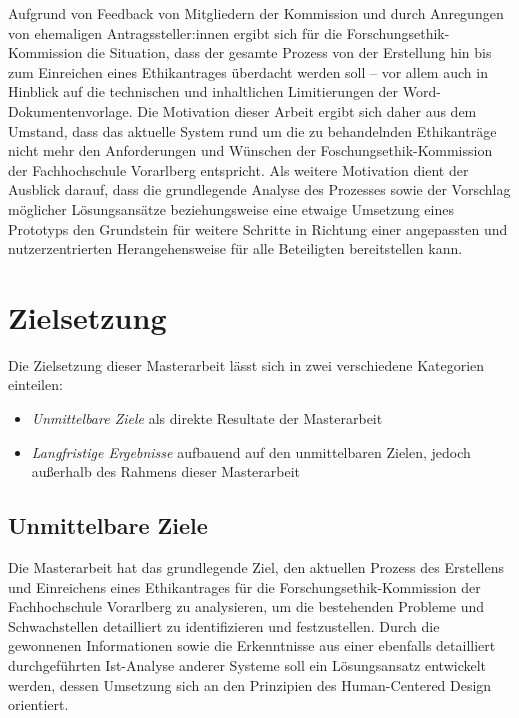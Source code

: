 \medskip

Aufgrund von Feedback von Mitgliedern der Kommission und durch Anregungen von ehemaligen Antragssteller:innen ergibt sich für die Forschungsethik-Kommission die Situation, dass der gesamte Prozess von der Erstellung hin bis zum Einreichen eines Ethikantrages überdacht werden soll -- vor allem auch in Hinblick auf die technischen und inhaltlichen Limitierungen der Word-Dokumentenvorlage. Die Motivation dieser Arbeit ergibt sich daher aus dem Umstand, dass das aktuelle System rund um die zu behandelnden Ethikanträge nicht mehr den Anforderungen und Wünschen der Foschungsethik-Kommission der Fachhochschule Vorarlberg entspricht. Als weitere Motivation dient der Ausblick darauf, dass die grundlegende Analyse des Prozesses sowie der Vorschlag möglicher Lösungsansätze beziehungsweise eine etwaige Umsetzung eines Prototyps den Grundstein für weitere Schritte in Richtung einer angepassten und nutzerzentrierten Herangehensweise für alle Beteiligten bereitstellen kann. 

\section{Zielsetzung}
\label{sec:zielsetzung}

Die Zielsetzung dieser Masterarbeit lässt sich in zwei verschiedene Kategorien einteilen:
\begin{itemize}
    \item \textit{Unmittelbare Ziele} als direkte Resultate der Masterarbeit
    \item \textit{Langfristige Ergebnisse} aufbauend auf den unmittelbaren Zielen, jedoch außerhalb des Rahmens dieser Masterarbeit
\end{itemize}

\subsection{Unmittelbare Ziele}
\label{sub-sec:unmittelbare-ziele}

Die Masterarbeit hat das grundlegende Ziel, den aktuellen Prozess des Erstellens und Einreichens eines Ethikantrages für die Forschungsethik-Kommission der Fachhochschule Vorarlberg zu analysieren, um die bestehenden Probleme und Schwachstellen detailliert zu identifizieren und festzustellen. Durch die gewonnenen Informationen sowie die Erkenntnisse aus einer ebenfalls detailliert durchgeführten Ist-Analyse anderer Systeme soll ein Lösungsansatz entwickelt werden, dessen Umsetzung sich an den Prinzipien des Human-Centered Design orientiert.

